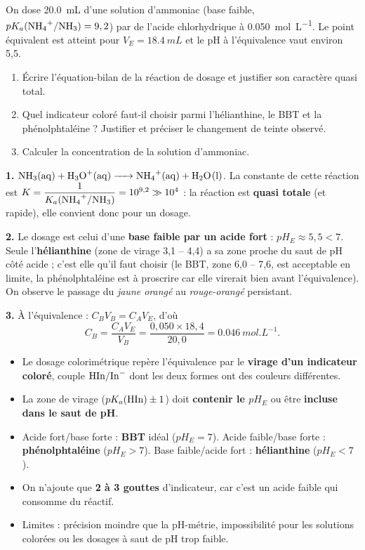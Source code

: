 \documentclass[11pt]{article}
\newcommand{\cle}[1]{{\popxbold\color{popdark}#1}}
\begin{document}
\begin{exercice}
On dose \SI{20,0}{mL} d'une solution d'ammoniac  (base faible, $pK_a(\ce{NH4+}/\ce{NH3}) = 9,2$) par de l'acide chlorhydrique à \SI{0,050}{mol.L^{-1}}. Le point équivalent est atteint pour $V_E = \SI{18,4}{mL}$ et le pH à l'équivalence vaut environ 5,5.
\begin{enumerate}
  \item Écrire l'équation-bilan de la réaction de dosage et justifier son caractère quasi total.
  \item Quel indicateur coloré faut-il choisir parmi l'hélianthine, le BBT et la phénolphtaléine ? Justifier et préciser le changement de teinte observé.
  \item Calculer la concentration de la solution d'ammoniac.
\end{enumerate}
\end{exercice}

\begin{corrige}
\textbf{1.} $\ce{NH3(aq) + H3O+(aq) -> NH4+(aq) + H2O(l)}$. La constante de cette réaction est $K = \dfrac{1}{K_a(\ce{NH4+}/\ce{NH3})} = 10^{9,2} \gg 10^4$ : la réaction est \textbf{quasi totale} (et rapide), elle convient donc pour un dosage.

\textbf{2.} Le dosage est celui d'une \textbf{base faible par un acide fort} : $pH_E \approx 5,5 < 7$. Seule l'\textbf{hélianthine} (zone de virage 3,1 -- 4,4) a sa zone proche du saut de pH côté acide ; c'est elle qu'il faut choisir (le BBT, zone 6,0 -- 7,6, est acceptable en limite, la phénolphtaléine est à proscrire car elle virerait bien avant l'équivalence). On observe le passage du \emph{jaune orangé} au \emph{rouge-orangé} persistant.

\textbf{3.} À l'équivalence : $C_B V_B = C_A V_E$, d'où
\[ C_B = \frac{C_A V_E}{V_B} = \frac{0{,}050 \times 18{,}4}{20{,}0} = \SI{0,046}{mol.L^{-1}}. \]
\end{corrige}

\begin{aretenir}
\begin{itemize}
  \item Le \cle{dosage colorimétrique} repère l'équivalence par le \textbf{virage d'un indicateur coloré}, couple $\ce{HIn}/\ce{In-}$ dont les deux formes ont des couleurs différentes.
  \item La \cle{zone de virage} ($pK_a(\ce{HIn}) \pm 1$) doit \textbf{contenir le $pH_E$} ou être \textbf{incluse dans le saut de pH}.
  \item Acide fort/base forte : \textbf{BBT} idéal ($pH_E = 7$). Acide faible/base forte : \textbf{phénolphtaléine} ($pH_E > 7$). Base faible/acide fort : \textbf{hélianthine} ($pH_E < 7$).
  \item On n'ajoute que \textbf{2 à 3 gouttes} d'indicateur, car c'est un acide faible qui consomme du réactif.
  \item Limites : précision moindre que la pH-métrie, impossibilité pour les solutions colorées ou les dosages à saut de pH trop faible.
\end{itemize}
\end{aretenir}
\end{document}
